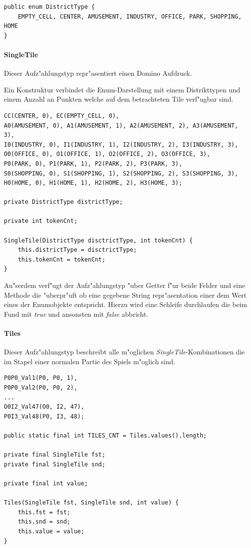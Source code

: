 \begin{lstlisting}[style=CodeHighlighting]
public enum DistrictType {
    EMPTY_CELL, CENTER, AMUSEMENT, INDUSTRY, OFFICE, PARK, SHOPPING, HOME
}
\end{lstlisting}


\paragraph{SingleTile}
\label{par:singleTile}
Dieser Aufz"ahlungstyp repr"asentiert einen Domino Aufdruck. 

Ein Konstruktur verbindet die Enum-Darstellung mit einem Distrikttypen und einem Anzahl an Punkten welche auf dem betrachteten Tile verf"ugbar sind. 

\begin{lstlisting}[style=CodeHighlighting]
CC(CENTER, 0), EC(EMPTY_CELL, 0),
A0(AMUSEMENT, 0), A1(AMUSEMENT, 1), A2(AMUSEMENT, 2), A3(AMUSEMENT, 3),
I0(INDUSTRY, 0), I1(INDUSTRY, 1), I2(INDUSTRY, 2), I3(INDUSTRY, 3),
O0(OFFICE, 0), O1(OFFICE, 1), O2(OFFICE, 2), O3(OFFICE, 3),
P0(PARK, 0), P1(PARK, 1), P2(PARK, 2), P3(PARK, 3),
S0(SHOPPING, 0), S1(SHOPPING, 1), S2(SHOPPING, 2), S3(SHOPPING, 3),
H0(HOME, 0), H1(HOME, 1), H2(HOME, 2), H3(HOME, 3);

private DistrictType districtType;

private int tokenCnt;

SingleTile(DistrictType disctrictType, int tokenCnt) {
    this.districtType = disctrictType;
    this.tokenCnt = tokenCnt;
}
\end{lstlisting}

Au"serdem verf"ugt der Aufz"ahlungstyp "uber Getter f"ur beide Felder und eine Methode die "uberpr"uft ob eine gegebene String repr"asentation einer dem Wert eines der Enumobjekte entspricht. Hierzu wird eine Schleife durchlaufen die beim Fund mit \emph{true} und ansonsten mit \emph{false} abbricht. 

\paragraph{Tiles}
\label{par:tiles}
Dieser Aufz"ahlungstyp beschreibt alle m"oglichen \emph{SingleTile}-Kombinationen die im Stapel einer normalen Partie des Spiels m"oglich sind. 

\begin{lstlisting}[style=CodeHighlighting]
P0P0_Val1(P0, P0, 1),
P0P0_Val2(P0, P0, 2),
...
O0I2_Val47(O0, I2, 47),
P0I3_Val48(P0, I3, 48);

public static final int TILES_CNT = Tiles.values().length;

private final SingleTile fst;
private final SingleTile snd;

private final int value;

Tiles(SingleTile fst, SingleTile snd, int value) {
    this.fst = fst;
    this.snd = snd;
    this.value = value;
}
\end{lstlisting}

